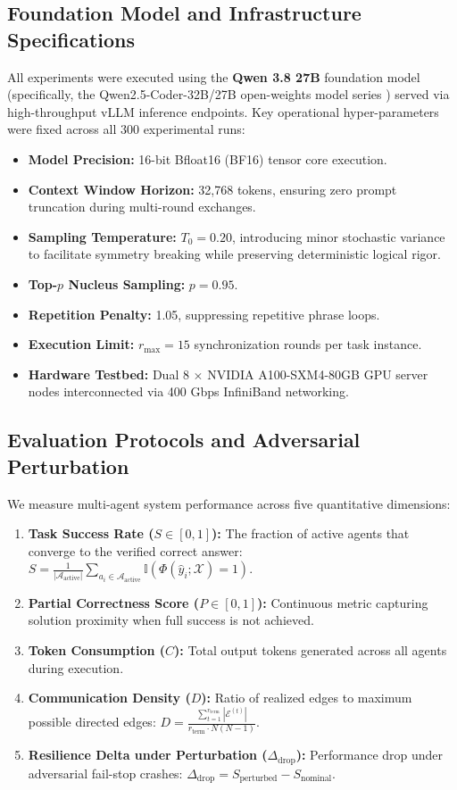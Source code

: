 \documentclass{ieeeaccess}
\begin{document}
\subsection{Foundation Model and Infrastructure Specifications}
All experiments were executed using the \textbf{Qwen 3.8 27B} foundation model (specifically, the Qwen2.5-Coder-32B/27B open-weights model series \cite{yang2024qwen25}) served via high-throughput vLLM inference endpoints. Key operational hyper-parameters were fixed across all 300 experimental runs:
\begin{itemize}
    \item \textbf{Model Precision:} 16-bit Bfloat16 (BF16) tensor core execution.
    \item \textbf{Context Window Horizon:} 32,768 tokens, ensuring zero prompt truncation during multi-round exchanges.
    \item \textbf{Sampling Temperature:} $T_0 = 0.20$, introducing minor stochastic variance to facilitate symmetry breaking while preserving deterministic logical rigor.
    \item \textbf{Top-$p$ Nucleus Sampling:} $p = 0.95$.
    \item \textbf{Repetition Penalty:} 1.05, suppressing repetitive phrase loops.
    \item \textbf{Execution Limit:} $r_{\max} = 15$ synchronization rounds per task instance.
    \item \textbf{Hardware Testbed:} Dual 8 $\times$ NVIDIA A100-SXM4-80GB GPU server nodes interconnected via 400 Gbps InfiniBand networking.
\end{itemize}

\subsection{Evaluation Protocols and Adversarial Perturbation}
We measure multi-agent system performance across five quantitative dimensions:
\begin{enumerate}
    \item \textbf{Task Success Rate ($S \in [0, 1]$):} The fraction of active agents that converge to the verified correct answer: $S = \frac{1}{|\mathcal{A}_{\text{active}}|} \sum_{a_i \in \mathcal{A}_{\text{active}}} \mathbb{I}\left( \Phi(\hat{y}_i; \mathcal{X}) = 1 \right)$.
    \item \textbf{Partial Correctness Score ($P \in [0, 1]$):} Continuous metric capturing solution proximity when full success is not achieved.
    \item \textbf{Token Consumption ($C$):} Total output tokens generated across all agents during execution.
    \item \textbf{Communication Density ($D$):} Ratio of realized edges to maximum possible directed edges: $D = \frac{\sum_{t=1}^{r_{\text{term}}} |\mathcal{E}^{(t)}|}{r_{\text{term}} \cdot N(N-1)}$.
    \item \textbf{Resilience Delta under Perturbation ($\Delta_{\text{drop}}$):} Performance drop under adversarial fail-stop crashes: $\Delta_{\text{drop}} = S_{\text{perturbed}} - S_{\text{nominal}}$.
\end{enumerate}
\end{document}
